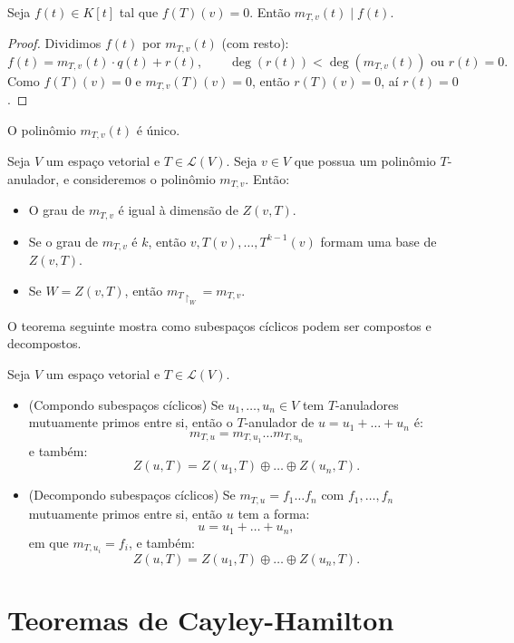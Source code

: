 \documentclass[11pt,twoside,a4paper]{book}
\begin{document}
\begin{lema}
Seja $f(t)\in K[t]$ tal que $f(T)(v)=0$. Então $m_{T,v}(t)\mid f(t)$.
\end{lema}
\begin{proof}
Dividimos $f(t)$ por $m_{T,v}(t)$ (com resto):
\[
f(t)=m_{T,v}(t)\cdot q(t)+r(t),\quad\quad\deg(r(t))<\deg(m_{T,v}(t))\text{ ou }r(t)=0.
\]
Como $f(T)(v)=0$ e $m_{T,v}(T)(v)=0$, então $r(T)(v)=0$, aí $r(t)=0$.
\end{proof}

\begin{corolario}
O polinômio $m_{T,v}(t)$ é único.
\end{corolario}

\begin{teorema}
Seja $V$ um espaço vetorial e $T\in\mathcal{L}(V)$. Seja $v\in V$ que possua um polinômio $T$-anulador, e consideremos o polinômio $m_{T,v}$. Então:
\begin{itemize}
\item O grau de $m_{T,v}$ é igual à dimensão de $Z(v,T)$.
\item Se o grau de $m_{T,v}$ é $k$, então $v,T(v),\dots,T^{k-1}(v)$ formam uma base de $Z(v,T)$.
\item Se $W=Z(v,T)$, então $m_{T\upharpoonright_W}=m_{T,v}$.
\end{itemize}
\end{teorema}

\noindent
O teorema seguinte mostra como subespaços cíclicos podem ser compostos e decompostos.

\begin{teorema}\label{ciclico}
Seja $V$ um espaço vetorial e $T\in\mathcal{L}(V)$.
\begin{itemize}
\item (Compondo subespaços cíclicos) Se $u_1,\dots,u_n\in V$ tem $T$-anuladores mutuamente primos entre si, então o $T$-anulador de $u=u_1+\dots+u_n$ é:
\[
m_{T,u}=m_{T,u_1}\dots m_{T,u_n}
\]
e também:
\[
Z(u,T)=Z(u_1,T)\oplus\dots\oplus Z(u_n,T).
\]
\item (Decompondo subespaços cíclicos) Se $m_{T,u}=f_1\dots f_n$ com $f_1,\dots,f_n$ mutuamente primos entre si, então $u$ tem a forma:
\[
u=u_1+\dots+u_n,
\]
em que $m_{T,u_i}=f_i$, e também:
\[
Z(u,T)=Z(u_1,T)\oplus\dots\oplus Z(u_n,T).
\]
\end{itemize}
\end{teorema}

\section{Teoremas de Cayley-Hamilton}
\end{document}
